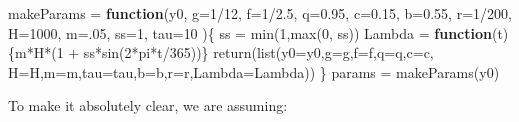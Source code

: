 \documentclass[
]{book}
\newenvironment{Shaded}{\begin{snugshade}}{\end{snugshade}}
\newcommand{\AttributeTok}[1]{\textcolor[rgb]{0.77,0.63,0.00}{#1}}
\newcommand{\ControlFlowTok}[1]{\textcolor[rgb]{0.13,0.29,0.53}{\textbf{#1}}}
\newcommand{\DecValTok}[1]{\textcolor[rgb]{0.00,0.00,0.81}{#1}}
\newcommand{\FloatTok}[1]{\textcolor[rgb]{0.00,0.00,0.81}{#1}}
\newcommand{\FunctionTok}[1]{\textcolor[rgb]{0.00,0.00,0.00}{#1}}
\newcommand{\NormalTok}[1]{#1}
\newcommand{\OtherTok}[1]{\textcolor[rgb]{0.56,0.35,0.01}{#1}}
\newcommand{\SpecialCharTok}[1]{\textcolor[rgb]{0.00,0.00,0.00}{#1}}
\begin{document}
\begin{Shaded}
\begin{Highlighting}[]
\NormalTok{makeParams }\OtherTok{=} \ControlFlowTok{function}\NormalTok{(y0, }
                      \AttributeTok{g=}\DecValTok{1}\SpecialCharTok{/}\DecValTok{12}\NormalTok{, }\AttributeTok{f=}\DecValTok{1}\SpecialCharTok{/}\FloatTok{2.5}\NormalTok{, }\AttributeTok{q=}\FloatTok{0.95}\NormalTok{,  }
                      \AttributeTok{c=}\FloatTok{0.15}\NormalTok{,}
                      \AttributeTok{b=}\FloatTok{0.55}\NormalTok{, }\AttributeTok{r=}\DecValTok{1}\SpecialCharTok{/}\DecValTok{200}\NormalTok{, }\AttributeTok{H=}\DecValTok{1000}\NormalTok{,  }
                      \AttributeTok{m=}\NormalTok{.}\DecValTok{05}\NormalTok{, }\AttributeTok{ss=}\DecValTok{1}\NormalTok{,  }
                      \AttributeTok{tau=}\DecValTok{10}  
\NormalTok{                      )\{}
\NormalTok{  ss }\OtherTok{=} \FunctionTok{min}\NormalTok{(}\DecValTok{1}\NormalTok{,}\FunctionTok{max}\NormalTok{(}\DecValTok{0}\NormalTok{, ss))}
\NormalTok{  Lambda }\OtherTok{=} \ControlFlowTok{function}\NormalTok{(t)\{m}\SpecialCharTok{*}\NormalTok{H}\SpecialCharTok{*}\NormalTok{(}\DecValTok{1} \SpecialCharTok{+}\NormalTok{ ss}\SpecialCharTok{*}\FunctionTok{sin}\NormalTok{(}\DecValTok{2}\SpecialCharTok{*}\NormalTok{pi}\SpecialCharTok{*}\NormalTok{t}\SpecialCharTok{/}\DecValTok{365}\NormalTok{))\}}
  \FunctionTok{return}\NormalTok{(}\FunctionTok{list}\NormalTok{(}\AttributeTok{y0=}\NormalTok{y0,}\AttributeTok{g=}\NormalTok{g,}\AttributeTok{f=}\NormalTok{f,}\AttributeTok{q=}\NormalTok{q,}\AttributeTok{c=}\NormalTok{c,}
              \AttributeTok{H=}\NormalTok{H,}\AttributeTok{m=}\NormalTok{m,}\AttributeTok{tau=}\NormalTok{tau,}\AttributeTok{b=}\NormalTok{b,}\AttributeTok{r=}\NormalTok{r,}\AttributeTok{Lambda=}\NormalTok{Lambda))}
\NormalTok{\} }
\NormalTok{params }\OtherTok{=} \FunctionTok{makeParams}\NormalTok{(y0)}
\end{Highlighting}
\end{Shaded}

To make it absolutely clear, we are assuming:
\end{document}
